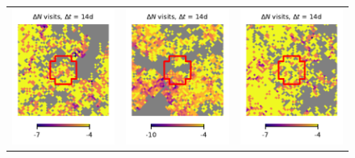 \documentclass[preprintm,linenumbers]{aastex631}
\begin{document}
\begin{figure}
\begin{tabular}{  c c c}
				\includegraphics{results/skymaps_cutout/skymaps_cutout_delta_first_year_one_snap_v4_0_10yrs_db_noDD_noTwi_tscale-14_nside-256_doAllTemplateMetrics_reduceCount_g_NES_noDD_noTwi.pdf} &
				\includegraphics{results/skymaps_cutout/skymaps_cutout_delta_first_year_one_snap_v4_0_10yrs_db_noDD_noTwi_tscale-14_nside-256_doAllTemplateMetrics_reduceCount_g_WFD_noDD_noTwi.pdf} &
				\includegraphics{results/skymaps_cutout/skymaps_cutout_delta_first_year_one_snap_v4_0_10yrs_db_noDD_noTwi_tscale-14_nside-256_doAllTemplateMetrics_reduceCount_g_GP_noDD_noTwi.pdf} \\

\end{tabular}
\end{figure}
\end{document}
